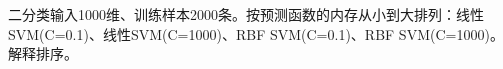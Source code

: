 二分类输入1000维、训练样本2000条。按预测函数的内存从小到大排列：线性SVM(C=0.1)、线性SVM(C=1000)、RBF SVM(C=0.1)、RBF SVM(C=1000)。解释排序。

